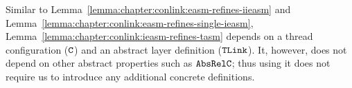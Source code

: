 Similar to Lemma~\ref{lemma:chapter:conlink:easm-refines-iieasm} and Lemma~\ref{lemma:chapter:conlink:easm-refines-single-ieasm},
Lemma~\ref{lemma:chapter:conlink:ieasm-refines-tasm} depends on a thread configuration (${{\mathrm{\texttt{C}}}}$) and an abstract layer definition (${{\mathrm{\texttt{TLink}}}}$).
It, however, does not depend on other abstract properties such as ${{\mathrm{\texttt{AbsRelC}}}}$; thus
using it does not require us to introduce any additional concrete definitions. 



%

%
